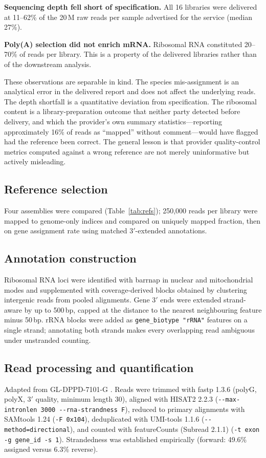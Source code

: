 \textbf{Sequencing depth fell short of specification.} All 16 libraries were delivered at
11--62\% of the 20\,M raw reads per sample advertised for the service (median 27\%).

\textbf{Poly(A) selection did not enrich mRNA.} Ribosomal RNA constituted 20--70\% of reads per
library. This is a property of the delivered libraries rather than of the downstream analysis.

These observations are separable in kind. The species mis-assignment is an analytical error in
the delivered report and does not affect the underlying reads. The depth shortfall is a
quantitative deviation from specification. The ribosomal content is a library-preparation
outcome that neither party detected before delivery, and which the provider's own summary
statistics---reporting approximately 16\% of reads as ``mapped'' without comment---would have
flagged had the reference been correct. The general lesson is that provider quality-control
metrics computed against a wrong reference are not merely uninformative but actively
misleading.

\subsection{Reference selection}
Four assemblies were compared (Table~\ref{tab:refs}); 250,000 reads per library were mapped to
genome-only indices and compared on uniquely mapped fraction, then on gene assignment rate
using matched 3$'$-extended annotations.

\subsection{Annotation construction}
Ribosomal RNA loci were identified with barrnap \cite{seemann2013barrnap} in nuclear and
mitochondrial modes and supplemented with coverage-derived blocks obtained by clustering
intergenic reads from pooled alignments. Gene 3$'$ ends were extended strand-aware by up to
500\,bp, capped at the distance to the nearest neighbouring feature minus 50\,bp. rRNA blocks
were added as \texttt{gene\_biotype "rRNA"} features on a single strand; annotating both
strands makes every overlapping read ambiguous under unstranded counting.

\subsection{Read processing and quantification}
Adapted from GL-DPPD-7101-G \cite{genelab7101G}. Reads were trimmed with fastp 1.3.6
\cite{chen2018fastp} (polyG, polyX, 3$'$ quality, minimum length 30), aligned with HISAT2 2.2.3
\cite{kim2019hisat2} (\texttt{-{}-max-intronlen 3000 -{}-rna-strandness F}), reduced to primary
alignments with SAMtools 1.24 \cite{danecek2021samtools} (\texttt{-F 0x104}),
deduplicated with UMI-tools 1.1.6 \cite{smith2017umitools}
(\texttt{-{}-method=directional}), and counted with featureCounts (Subread 2.1.1)
\cite{liao2014featurecounts} (\texttt{-t exon -g gene\_id -s 1}). Strandedness was established
empirically (forward: 49.6\% assigned versus 6.3\% reverse).

